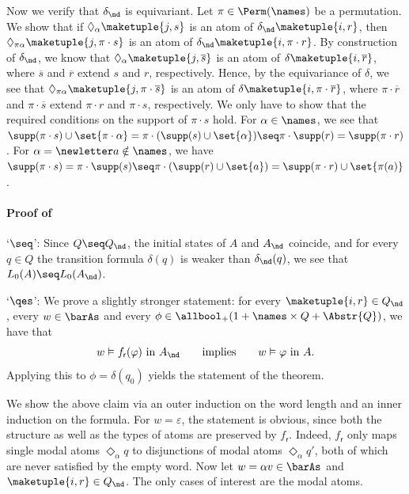 \documentclass[10pt, final, conference, a4paper, twocolumn]{IEEEtran}
\renewcommand{\enquote}[1]{`#1'}
\begin{document}
\begin{IEEEproof}
  Now we verify that $\delta_{\nd}$ is equivariant. Let $\pi \in \Perm(\names)$ be a permutation.
  We show that if $\Diamond_\alpha \maketuple{j,s}$ is an atom of $\delta_{\nd}\maketuple{i,r}$, then
  $\Diamond_{\pi\alpha} \maketuple{j,\pi\cdot s}$ is an atom of $\delta_{\nd}\maketuple{i,\pi\cdot r}$.
  By construction of $\delta_{\nd}$, we know that $\Diamond_\alpha \maketuple{j,\overline{s}}$ is an atom of
  $\delta\maketuple{i, \overline{r}}$, where $\overline{s}$ and $\overline{r}$ extend $s$ and $r$, respectively.
  Hence, by the equivariance of $\delta$, we see that $\Diamond_{\pi\alpha} \maketuple{j, \pi\cdot\overline{s}}$ is an atom of $\delta\maketuple{i, \pi\cdot\overline{r}}$, where $\pi\cdot\overline{r}$ and $\pi\cdot\overline{s}$ extend $\pi\cdot r$
  and $\pi\cdot s$, respectively. We only have to show that the required conditions on the support of $\pi\cdot s$ hold.
  For $\alpha \in \names$, we see that $\supp(\pi\cdot s) \cup \set{\pi\cdot \alpha} = \pi \cdot (\supp(s) \cup \set{\alpha})
  \seq \pi \cdot \supp(r) = \supp(\pi\cdot r)$. For $\alpha=\newletter a \notin \names$, we have $\supp(\pi\cdot s) = \pi \cdot \supp(s) \seq
  \pi \cdot (\supp(r) \cup \set{a}) = \supp(\pi\cdot r) \cup \set{\pi(a)}$.
\end{IEEEproof}


\paragraph*{Proof of~}
  \enquote{$\seq$}: Since $Q \seq Q_{\nd}$, the initial states of $A$ and $A_{\nd}$ coincide,
    and for every $q \in Q$ the transition formula $\delta(q)$ is weaker than $\delta_{\nd}(q)$,
    we see that $L_0(A) \seq L_0(A_{\nd})$.

  \enquote{$\qes$}: We prove a slightly stronger statement: for every $\maketuple{i, r}
    \in Q_{\nd}$, every  $w \in \barAs$ and every $\phi\in \allbool_+(1 + \names \times Q + \Abstr{Q})$, we have that
\[ w \vDash f_{\mathsf{r}}(\varphi) \text{ in $A_{\nd}$} \qquad\text{implies}\qquad w \vDash \varphi \text{ in $A$}.\]
Applying this to $\phi=\delta(q_0)$ yields the statement of the theorem.

 We show the above claim via an outer induction on the word length and an inner induction on the formula.
    For $w = \varepsilon$, the statement is obvious, since both the structure as well as the types of atoms are preserved by $f_{\mathsf{r}}$.
    Indeed, $f_{\mathsf{r}}$ only maps single modal atoms $\Diamond_\alpha q$ to  disjunctions of modal atoms $\Diamond_\alpha q'$, both of which are never satisfied by the empty word.
    Now let $w = \alpha v \in \barAs$ and $\maketuple{i, r} \in Q_{\nd}$.
    The only cases of interest are the modal atoms.
\end{document}
